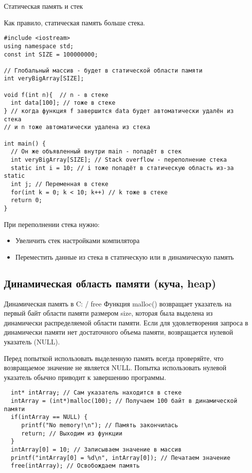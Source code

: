 \begin{frame}[t,fragile]{Статическая память и стек}

Как правило, статическая память больше стека.

\begin{lstlisting}
#include <iostream>
using namespace std;
const int SIZE = 100000000;

// Глобальный массив - будет в статической области памяти
int veryBigArray[SIZE];

void f(int n){  // n - в стеке
  int data[100]; // тоже в стеке
} // когда функция f завершится data будет автоматически удалён из стека
// и n тоже автоматически удалена из стека

int main() {
  // Он же объявленный внутри main - попадёт в стек
  int veryBigArray[SIZE]; // Stack overflow - переполнение стека
  static int i = 10; // i тоже попадёт в статическую область из-за static
  int j; // Переменная в стеке
  for(int k = 0; k < 10; k++) // k тоже в стеке
  return 0;
}
\end{lstlisting}  

При переполнении стека нужно:
     \begin{itemize}
        \item Увеличить стек настройками компилятора
        \item Переместить данные из стека в статическую или в динамическую память
     \end{itemize}
\end{frame}

\subsection{Динамическая область памяти (куча, heap)}
\begin{frame}[t,fragile]{Динамическая память в C:  / free}
Функция malloc() возвращает указатель на первый байт области памяти размером size, 
которая была выделена из динамически распределяемой области памяти. 
Если для удовлетворения запроса в динамически памяти нет достаточного объема памяти, 
возвращается нулевой указатель (NULL). 

Перед попыткой использовать выделенную память всегда проверяйте, 
что возвращаемое значение не является NULL. 
Попытка использовать нулевой указатель обычно приводит к завершению программы. 

\begin{lstlisting}  
  int* intArray; // Сам указатель находится в стеке
  intArray = (int*)malloc(100); // Получаем 100 байт в динамической памяти
  if(intArray == NULL) {
     printf("No memory!\n"); // Память закончилась
     return; // Выходим из функции
  }
  intArray[0] = 10; // Записываем значение в массив
  printf("intArray[0] = %d\n", intArray[0]); // Печатаем значение
  free(intArray); // Освобождаем память
\end{lstlisting}  

\end{frame}


